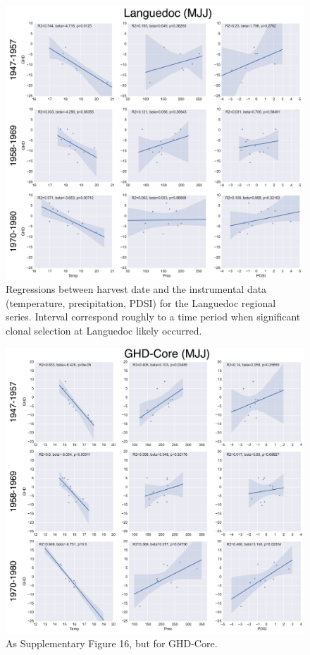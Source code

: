 \documentclass[12pt]{article}
\begin{document}
\begin{figure}
\center
\includegraphics[width=1.0\columnwidth,scale=2]{SUPP_fig_16_clonetest_Lan.png}
\caption{Regressions between harvest date and the instrumental data (temperature, precipitation, PDSI) for the Languedoc regional series. Interval correspond roughly to a time period when significant clonal selection at Languedoc likely occurred.}
\end{figure}

\begin{figure}
\center
\includegraphics[width=1.0\columnwidth,scale=2]{SUPP_fig_17_clonetest_GHDcore.png}
\caption{As Supplementary Figure 16, but for GHD-Core.}
\end{figure}
\end{document}
